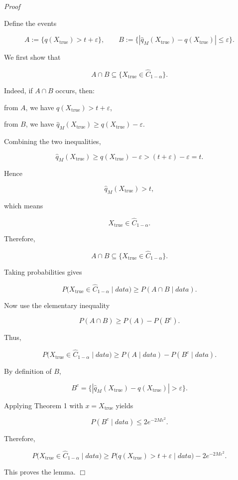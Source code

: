 \documentclass{article}
\begin{document}
\textit{Proof}

Define the events

\[
A:=\{q(X_{\mathrm{true}})>t+\varepsilon\}, \qquad
B:=\{|\hat{q}_M(X_{\mathrm{true}})-q(X_{\mathrm{true}})|\le \varepsilon\}.
\]

We first show that

\[
A\cap B\subseteq \{X_{\mathrm{true}}\in \hat{C}_{1-\alpha}\}.
\]

Indeed, if $A\cap B$ occurs, then:

from $A$, we have $q(X_{\mathrm{true}})>t+\varepsilon$,

from $B$, we have $\hat{q}_M(X_{\mathrm{true}})\ge q(X_{\mathrm{true}})-\varepsilon$.

Combining the two inequalities,

\[
\hat{q}_M(X_{\mathrm{true}})
\ge
q(X_{\mathrm{true}})-\varepsilon
>
(t+\varepsilon)-\varepsilon
=
t.
\]

Hence

\[
\hat{q}_M(X_{\mathrm{true}})>t,
\]

which means

\[
X_{\mathrm{true}}\in \hat{C}_{1-\alpha}.
\]

Therefore,

\[
A\cap B\subseteq \{X_{\mathrm{true}}\in \hat{C}_{1-\alpha}\}.
\]

Taking probabilities gives

\[
P\bigl(X_{\mathrm{true}}\in \hat{C}_{1-\alpha}\mid data\bigr)
\ge
P(A\cap B\mid data).
\]

Now use the elementary inequality

\[
P(A\cap B)\ge P(A)-P(B^c).
\]

Thus,

\[
P\bigl(X_{\mathrm{true}}\in \hat{C}_{1-\alpha}\mid data\bigr)
\ge
P(A\mid data)-P(B^c\mid data).
\]

By definition of $B$,

\[
B^c=\{|\hat{q}_M(X_{\mathrm{true}})-q(X_{\mathrm{true}})|>\varepsilon\}.
\]

Applying Theorem 1 with $x=X_{\mathrm{true}}$ yields

\[
P(B^c\mid data)\le 2e^{-2M\varepsilon^2}.
\]

Therefore,

\[
P\bigl(X_{\mathrm{true}}\in \hat{C}_{1-\alpha}\mid data\bigr)
\ge
P\bigl(q(X_{\mathrm{true}})>t+\varepsilon \mid data\bigr)
-
2e^{-2M\varepsilon^2}.
\]

This proves the lemma. \hfill $\Box$
\end{document}

